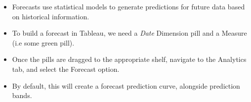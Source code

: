 \documentclass[xcolor=svgnames]{beamer} %
\begin{document}
%
%
%
%

\begin{frame}
\begin{itemize}
\item Forecasts use statistical models to generate predictions for future data based on historical information.\vfill
\item To build a forecast in Tableau, we need a \textit{Date} Dimension pill and a Measure (i.e some green pill).\vfill
\item Once the pills are dragged to the appropriate shelf, navigate to the Analytics tab, and select the Forecast option.\vfill
\item By default, this will create a forecast prediction curve, alongside prediction bands. 
\end{itemize}


\end{frame}
\end{document}
